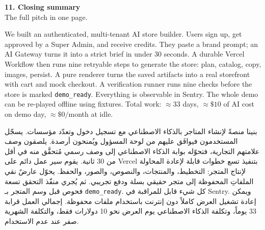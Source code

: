 \documentclass[11pt,a4paper]{article}
\DeclareRobustCommand{\ar}[1]{\RL{\arabicfont #1}}
\newenvironment{arblock}{\par\setRL\arabicfont\RaggedLeft}{\par}
\newcommand{\sectiontitle}[2]{%
  \vspace{4pt}
  \begin{tcolorbox}[
    enhanced, sharp corners, boxrule=0pt,
    colback=NavyDeep, coltext=white,
    left=10pt, right=10pt, top=6pt, bottom=6pt
  ]
    {\Large\bfseries #1}\\[1pt]
    {\small\color{Teal!40!white}#2}
  \end{tcolorbox}
}
\newcommand{\bilingual}[2]{%
  \noindent
  \begin{minipage}[t]{0.49\textwidth}
    \vspace{0pt}
    #1
  \end{minipage}\hfill
  \begin{minipage}[t]{0.49\textwidth}
    \vspace{0pt}
    \begin{arblock}#2\end{arblock}
  \end{minipage}\par\vspace{6pt}
}
\newcommand{\code}[1]{\texttt{\small\color{NavyDeep}#1}}
\begin{document}
\newpage

\sectiontitle{11. Closing summary \textbar{} \ar{الخلاصة}}{The full pitch in one page.}

\bilingual{
\begin{enbox}
We built an authenticated, multi-tenant AI store builder. Users sign up, get approved by a Super Admin, and receive credits. They paste a brand prompt; an AI Gateway turns it into a strict brief in under 30 seconds. A durable Vercel Workflow then runs nine retryable steps to generate the store: plan, catalog, copy, images, persist. A pure renderer turns the saved artifacts into a real storefront with cart and mock checkout. A verification runner runs nine checks before the store is marked \code{demo\_ready}. Everything is observable in Sentry. The whole demo can be re-played offline using fixtures. Total work: $\approx 33$ days, $\approx \$10$ of AI cost on demo day, $\approx \$0/$month at idle.
\end{enbox}
}{
\begin{arbox}[\ar{العرض الكامل في فقرة واحدة}]
بنينا منصةً لإنشاء المتاجر بالذكاء الاصطناعي مع تسجيل دخول وتعدّد مؤسسات. يسجّل المستخدمون فيوافَق عليهم من لوحة المسؤول ويُمنحون أرصدة. يلصقون وصف علامتهم التجارية، فتحوّله بوابة الذكاء الاصطناعي إلى وصف رسمي مُتحقَّق منه في أقل من 30 ثانية. يقوم سير عمل دائم على Vercel بتنفيذ تسع خطوات قابلة لإعادة المحاولة لإنتاج المتجر: التخطيط، والمنتجات، والنصوص، والصور، والحفظ. يحوّل عارضٌ نقي الملفاتِ المحفوظة إلى متجر حقيقي بسلة ودفع تجريبي. ثم يُجري منفّذ التحقق تسعة فحوص قبل وسم المتجر بـ \code{demo\_ready}. كل شيء قابل للمراقبة في Sentry. ويمكن إعادة تشغيل العرض كاملاً دون إنترنت باستخدام ملفات محفوظة. إجمالي العمل قرابة 33 يوماً، وتكلفة الذكاء الاصطناعي يوم العرض نحو 10 دولارات فقط، والتكلفة الشهرية صفر عند عدم الاستخدام.
\end{arbox}
}

\vspace{8pt}
\end{document}
